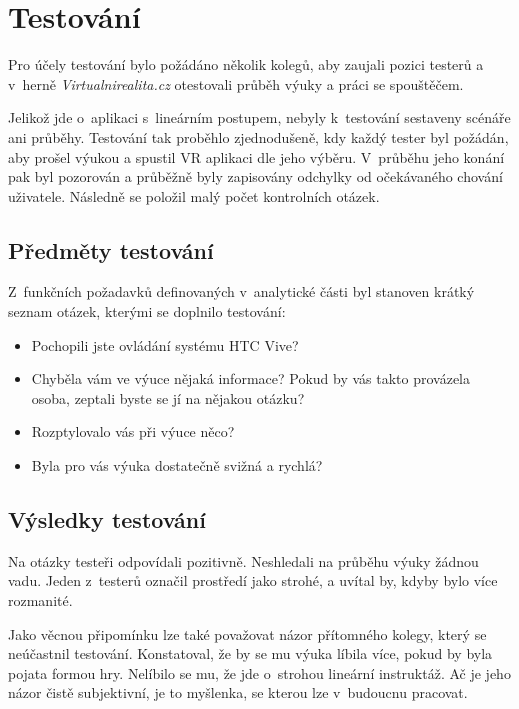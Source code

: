 \chapter{Testování}\label{testovuxe1nuxed}

Pro účely testování bylo požádáno několik kolegů, aby zaujali pozici
testerů a v~herně \emph{Virtualnirealita.cz} otestovali průběh výuky a
práci se spouštěčem.

Jelikož jde o~aplikaci s~lineárním postupem, nebyly k~testování
sestaveny scénáře ani průběhy. Testování tak proběhlo zjednodušeně, kdy
každý tester byl požádán, aby prošel výukou a spustil VR aplikaci dle
jeho výběru. V~průběhu jeho konání pak byl pozorován a průběžně
byly zapisovány odchylky od očekávaného chování uživatele. Následně se 
položil malý počet kontrolních otázek.

\section{Předměty testování}\label{pux159edmux11bty-testovuxe1nuxed}

Z~funkčních požadavků definovaných v~analytické části byl stanoven
krátký seznam otázek, kterými se doplnilo testování:

\begin{itemize}
  \item
    Pochopili jste ovládání systému HTC Vive?
  \item
    Chyběla vám ve výuce nějaká informace? Pokud by vás takto provázela osoba,
    zeptali byste se jí na nějakou otázku?
  \item
    Rozptylovalo vás při výuce něco?
  \item
    Byla pro vás výuka dostatečně svižná a rychlá?
\end{itemize}
    
\section{Výsledky testování}\label{vysledky-testovani}

Na otázky testeři odpovídali pozitivně. Neshledali na průběhu výuky
žádnou vadu. Jeden z~testerů označil prostředí jako strohé, a uvítal by,
kdyby bylo více rozmanité.

Jako věcnou připomínku lze také považovat názor přítomného kolegy, který se
neúčastnil testování. Konstatoval, že by se mu výuka líbila více, pokud by byla
pojata formou hry. Nelíbilo se mu, že jde o~strohou lineární instruktáž. Ač je
jeho názor čistě subjektivní, je to myšlenka, se kterou lze v~budoucnu pracovat.

